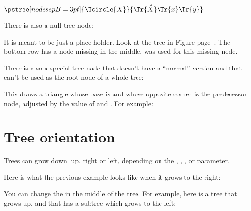 \documentclass[11pt,english,BCOR10mm,DIV12,bibliography=totoc,parskip=false,smallheadings
    headexclude,footexclude,oneside]{pst-doc}
\begin{document}
\begin{LTXexample}[pos=l]
$ \pstree[nodesepB=3pt]{\Tcircle{X}}{%
     \Tr{\tilde{\tilde{X}}}
     \Tr{x}
     \Tr{y}} $
\end{LTXexample}


There is also a null tree node: 
\begin{BDef}
\end{BDef}
It is meant to be just a place holder. Look at the tree in Figure
page~\pageref{allnodes}. The bottom row has a node missing in the middle.
\Largb{} was used for this missing node. 

There is also a special tree node that doesn't have a ``normal'' version and
that can't be used as the root node of a whole tree:
\begin{BDef}
\OptArgs 
\end{BDef}
This draws a triangle whose base is  %
and whose opposite corner is the predecessor node, adjusted by the value of
 and .
For example:

\begin{LTXexample}[pos=l]
\end{LTXexample}


\section{Tree orientation}

Trees can grow down, up, right or left, depending on the 
, , , or  parameter.

Here is what the previous example looks like when it grows to the right:

\begin{LTXexample}[pos=l,width=0.4\linewidth]
\end{LTXexample}


You can change the  in the middle of the tree.
For example, here is a tree that grows up, and that has a subtree which grows
to the left:

\begin{LTXexample}[pos=l,width=0.4\linewidth]
  \footnotesize
\end{LTXexample}
\end{document}
